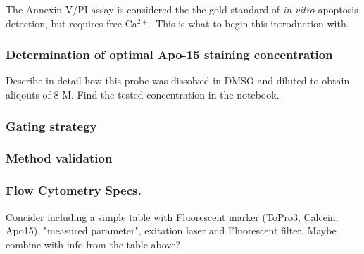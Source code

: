 The Annexin V/PI assay is considered the the gold standard of \emph{in vitro} apoptosis detection, but requires free Ca$^{2+}$. This is what to begin this introduction with.

\subsubsection{Determination of optimal Apo-15 staining concentration}
Describe in detail how this probe was dissolved in DMSO and diluted to obtain aliqouts of 8 \micro M. Find the tested concentration in the notebook.
\subsubsection{Gating strategy}

\subsubsection{Method validation}


\subsubsection{Flow Cytometry Specs.}


\begin{table}[H]
	\centering
	\caption{The \acrshort{fcm} acquisition and fluidics settings specified with the BD Accuri C6 Plus acquisition software during the flow cytometric experiments reported in this work.}
	\label{tb:FCM_settings}
\end{table}

Concider including a simple table with Fluorescent marker (ToPro3, Calcein, Apo15), "measured parameter", exitation laser and Fluorescent filter. Maybe combine with info from the table above?